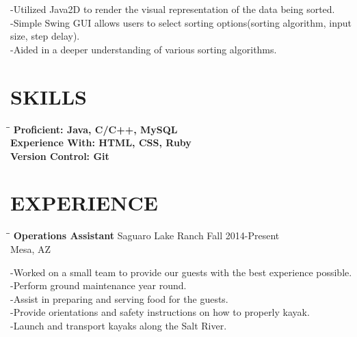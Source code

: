 \documentclass{res}
\begin{document}
\begin{resume}
    -Utilized Java2D to render the visual representation of the data being sorted.
    \\-Simple Swing GUI allows users to select sorting options(sorting algorithm, input size, step delay).
    \\-Aided in a deeper understanding of various sorting algorithms.
    
    \section{SKILLS}
    \vspace{0.05in} 
    \begin{tabbing}  
    	\hspace{2.3in}\= \hspace{2.6in}\= \kill       
    \bf Proficient:
    \>Java, C/C++, MySQL
    \\\bf Experience With:
    \>HTML, CSS, Ruby
    \\\bf Version Control:
    \>Git
	\end{tabbing}
    
    \section{EXPERIENCE}
    \vspace{0.05in}	
    \begin{tabbing}
    	\hspace{2.3in}\= \hspace{2.6in}\= \kill %
    	{\bf Operations Assistant} \>Saguaro Lake Ranch     \>Fall 2014-Present\\
    	\>Mesa, AZ
    \end{tabbing}\vspace{-20pt}      %
    -Worked on a small team to provide our guests with the best experience possible.
    \\-Perform ground maintenance year round.
    \\-Assist in preparing and serving food for the guests.
    \\-Provide orientations and safety instructions on how to properly kayak.
    \\-Launch and transport kayaks along the Salt River.
           

\end{resume}
\end{document}
